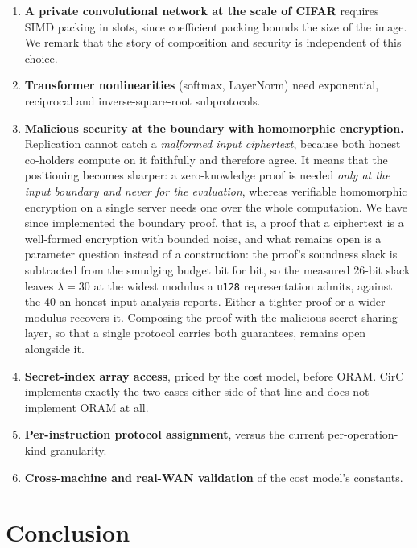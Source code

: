 \documentclass[11pt]{article}
\newcommand{\bt}[1]{\texttt{#1}}
\begin{document}
\begin{enumerate}
  \item \textbf{A private convolutional network at the scale of CIFAR} requires SIMD packing
    in slots, since coefficient packing bounds the size of the image. We remark that the story of
    composition and security is independent of this choice.
  \item \textbf{Transformer nonlinearities} (softmax, LayerNorm) need
    exponential, reciprocal and inverse-square-root subprotocols.
  \item \textbf{Malicious security at the boundary with homomorphic encryption.} Replication
    cannot catch a \emph{malformed input ciphertext}, because both honest co-holders compute on it
    faithfully and therefore agree. It means that the positioning becomes sharper: a
    zero-knowledge proof is needed \emph{only at the input boundary and never for the evaluation},
    whereas verifiable homomorphic encryption on a single server needs one over the whole
    computation. We have since implemented the boundary proof, that is, a proof that a ciphertext
    is a well-formed encryption with bounded noise, and what remains open is a parameter question
    instead of a construction: the proof's soundness slack is subtracted from the smudging budget
    bit for bit, so the measured \num{26}-bit slack leaves $\lambda = 30$ at the widest modulus a
    \bt{u128} representation admits, against the \num{40} an honest-input analysis reports. Either
    a tighter proof or a wider modulus recovers it. Composing the proof with the malicious
    secret-sharing layer, so that a single protocol carries both guarantees, remains open
    alongside it.
  \item \textbf{Secret-index array access}, priced by the cost model, before
    ORAM. CirC~\cite{CirC} implements exactly the two cases either side of that
    line and does not implement ORAM at all.
  \item \textbf{Per-instruction protocol assignment}, versus the current
    per-operation-kind granularity.
  \item \textbf{Cross-machine and real-WAN validation} of the cost model's
    constants.
\end{enumerate}

\section{Conclusion}
\end{document}
